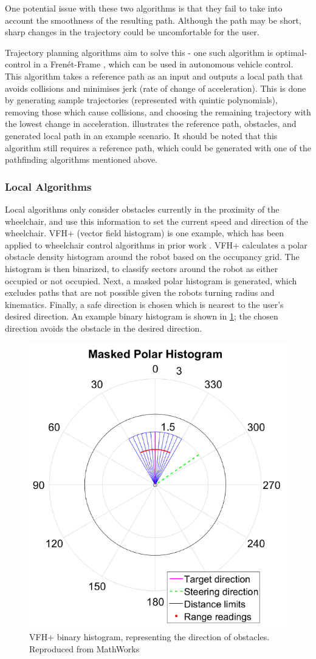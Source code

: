 One potential issue with these two algorithms is that they fail to take into account the smoothness of the resulting path.
Although the path may be short, sharp changes in the trajectory could be uncomfortable for the user.

Trajectory planning algorithms aim to solve this - one such algorithm is optimal-control in a Fren\'et-Frame \cite{werlingOptimalTrajectoryGeneration2010},
which can be used in autonomous vehicle control.
This algorithm takes a reference path as an input and outputs a local path that avoids collisions and minimises jerk (rate of change of acceleration).
This is done by generating sample trajectories (represented with quintic polynomials), removing those which cause collisions, and choosing
the remaining trajectory with the lowest change in acceleration.  illustrates the reference path, obstacles, and generated
local path in an example scenario.
It should be noted that this algorithm still requires a reference path, which could be generated
with one of the pathfinding algorithms mentioned above.

\subsubsection{Local Algorithms}
Local algorithms only consider obstacles currently in the proximity of the wheelchair,
and use this information to set the current speed and direction of the wheelchair.
VFH+ (vector field histogram) \cite{ulrichVFHReliableObstacle1998} is one example, which
has been applied to wheelchair control algorithms in prior work \cite{tomariEnhancingWheelchairControl2014}.
VFH+ calculates a polar obstacle density histogram around the robot based on the occupancy grid.
The histogram is then binarized, to classify sectors around the robot as either occupied or not occupied.
Next, a masked polar histogram is generated, which excludes paths that are not possible given the robots
turning radius and kinematics. Finally, a safe direction is chosen which is nearest to the user's desired direction.
An example binary histogram is shown in \cref{fig:binary_histogram_vfh}; the chosen direction avoids the obstacle in the
desired direction.

\begin{figure}[b]
    \centering
    \includegraphics[width=0.38\linewidth]{images/binary_histogram_vfh.png}
    \caption{VFH+ binary histogram, representing the direction of obstacles. Reproduced from MathWorks \cite{mathworksVectorFieldHistogram2022}}
    \label{fig:binary_histogram_vfh}
\end{figure}


